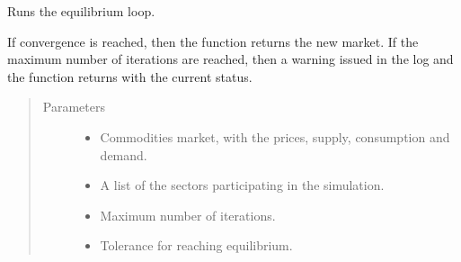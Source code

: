 \documentclass[letterpaper,10pt,english]{sphinxmanual}
\begin{document}

\begin{fulllineitems}
\label{\detokenize{api:muse.mca.find_equilibrium}}
Runs the equilibrium loop.

If convergence is reached, then the function returns the new market. If the maximum
number of iterations are reached, then a warning issued in the log and the function
returns with the current status.
\begin{quote}\begin{description}
\item[{Parameters}] \leavevmode\begin{itemize}
\item {} 
 \textendash{} Commodities market, with the prices, supply, consumption and demand.

\item {} 
 \textendash{} A list of the sectors participating in the simulation.

\item {} 
 \textendash{} Maximum number of iterations.

\item {} 
 \textendash{} Tolerance for reaching equilibrium.


\end{itemize}
\end{description}
\end{quote}
\end{fulllineitems}
\end{document}
